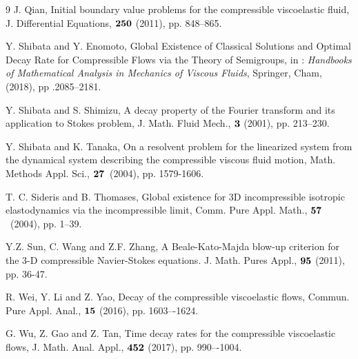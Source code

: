 \documentclass[dvipdfmx,12pt]{article}
\begin{document}
\begin{thebibliography}{9}
J. Qian, Initial boundary value problems for the compressible viscoelastic fluid, J. Differential Equations, $\bf{250}$ (2011), pp. 848--865. 

Y. Shibata and Y. Enomoto, Global Existence of Classical Solutions and Optimal Decay Rate for Compressible Flows via the Theory of Semigroups,  in : \textit{Handbooks of Mathematical Analysis in Mechanics of Viscous Fluids}, Springer, Cham, (2018), pp .2085--2181.

Y. Shibata and S. Shimizu, A decay property of the Fourier transform and its application to Stokes problem, J. Math. Fluid Mech., $\bf{3}$ (2001), pp. 213--230.

Y. Shibata and K. Tanaka, On a resolvent problem for the linearized system from the dynamical system describing the compressible viscous fluid motion, Math. Methods Appl. Sci., $\bf{27}$~(2004), pp. 1579-1606.

T. C. Sideris and B. Thomases, Global existence for 3D incompressible isotropic elastodynamics via the incompressible limit, Comm. Pure Appl. Math., $\bf{57}$~(2004), pp. 1--39.

Y.Z. Sun, C. Wang and Z.F. Zhang, A Beale-Kato-Majda blow-up criterion for the 3-D compressible Navier-Stokes equations. J. Math. Pures Appl., $\bf{95}$ (2011), pp. 36-47.

R. Wei, Y. Li and Z. Yao, Decay of the compressible viscoelastic flows, Commun. Pure Appl. Anal., $\bf{15}$ (2016), pp. 1603–-1624.

G. Wu, Z. Gao and Z. Tan, Time decay rates for the compressible viscoelastic flows, J. Math. Anal. Appl., $\bf{452}$ (2017),  pp. 990–-1004.
\end{thebibliography}
\end{document}
